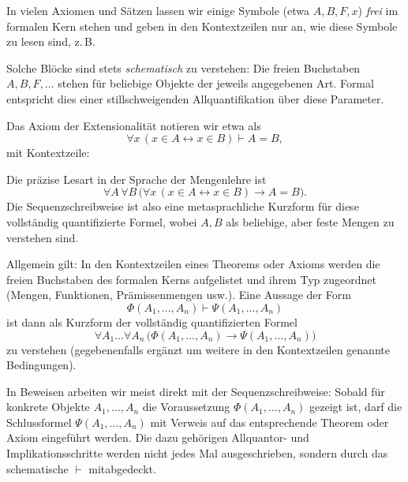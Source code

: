 \documentclass[main.tex]{subfiles}
\begin{document}
In vielen Axiomen und Sätzen lassen wir einige Symbole (etwa \(A,B,F,x\))
\emph{frei} im formalen Kern stehen und geben in den Kontextzeilen
nur an, wie diese Symbole zu lesen sind, z.\,B.

\leavevmode\newline
Solche Blöcke sind stets \emph{schematisch} zu verstehen: Die freien
Buchstaben \(A,B,F,\dots\) stehen für beliebige Objekte der jeweils
angegebenen Art. Formal entspricht dies einer stillschweigenden
Allquantifikation über diese Parameter.

\begin{example}[Extensionalität]
Das Axiom der Extensionalität notieren wir etwa als
\[
  \forall x\,(x \in A \leftrightarrow x \in B) \vdash A = B,
\]
mit Kontextzeile:

\leavevmode\newline
Die präzise Lesart in der Sprache der Mengenlehre ist
\[
  \forall A\,\forall B\,
    \bigl( \forall x\,(x \in A \leftrightarrow x \in B)
           \rightarrow A = B \bigr).
\]
Die Sequenzschreibweise ist also eine metasprachliche Kurzform
für diese vollständig quantifizierte Formel, wobei \(A,B\) als
beliebige, aber feste Mengen zu verstehen sind.
\end{example}

\begin{remark}
Allgemein gilt: In den Kontextzeilen eines Theorems oder Axioms
werden die freien Buchstaben des formalen Kerns aufgelistet und
ihrem Typ zugeordnet (Mengen, Funktionen, Prämissenmengen usw.).
Eine Aussage der Form
\[
  \Phi(A_1,\dots,A_n) \vdash \Psi(A_1,\dots,A_n)
\]
ist dann als Kurzform der vollständig quantifizierten Formel
\[
  \forall A_1 \dots \forall A_n\,
  \bigl(\Phi(A_1,\dots,A_n) \rightarrow
        \Psi(A_1,\dots,A_n)\bigr)
\]
zu verstehen (gegebenenfalls ergänzt um weitere in den
Kontextzeilen genannte Bedingungen).

In Beweisen arbeiten wir meist direkt mit der Sequenzschreibweise:
Sobald für konkrete Objekte \(A_1,\dots,A_n\) die Voraussetzung
\(\Phi(A_1,\dots,A_n)\) gezeigt ist, darf die Schlussformel
\(\Psi(A_1,\dots,A_n)\) mit Verweis auf das entsprechende Theorem
oder Axiom eingeführt werden. Die dazu gehörigen Allquantor- und
Implikationsschritte werden nicht jedes Mal ausgeschrieben, sondern
durch das schematische \(\vdash\) mitabgedeckt.
\end{remark}
\end{document}
